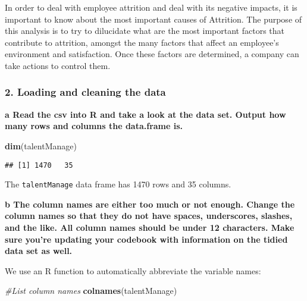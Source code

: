\documentclass[]{article}
\newenvironment{Shaded}{\begin{snugshade}}{\end{snugshade}}
\newcommand{\KeywordTok}[1]{\textcolor[rgb]{0.13,0.29,0.53}{\textbf{{#1}}}}
\newcommand{\CommentTok}[1]{\textcolor[rgb]{0.56,0.35,0.01}{\textit{{#1}}}}
\newcommand{\NormalTok}[1]{{#1}}
\begin{document}
In order to deal with employee attrition and deal with its negative
impacts, it is important to know about the most important causes of
Attrition. The purpose of this analysis is to try to dilucidate what are
the most important factors that contribute to attrition, amongst the
many factors that affect an employee's environment and satisfaction.
Once these factors are determined, a company can take actions to control
them.

\subsubsection{2. Loading and cleaning the
data}\label{loading-and-cleaning-the-data}

\textbf{a Read the csv into R and take a look at the data set. Output
how many rows and columns the data.frame is.}

\begin{Shaded}
\begin{Highlighting}[]
\KeywordTok{dim}\NormalTok{(talentManage)}
\end{Highlighting}
\end{Shaded}

\begin{verbatim}
## [1] 1470   35
\end{verbatim}

The \texttt{talentManage} data frame has 1470 rows and 35 columns.

\textbf{b The column names are either too much or not enough. Change the
column names so that they do not have spaces, underscores, slashes, and
the like. All column names should be under 12 characters. Make sure
you're updating your codebook with information on the tidied data set as
well.}

We use an R function to automatically abbreviate the variable names:

\begin{Shaded}
\begin{Highlighting}[]
\CommentTok{#List column names}
\KeywordTok{colnames}\NormalTok{(talentManage)}
\end{Highlighting}
\end{Shaded}
\end{document}
